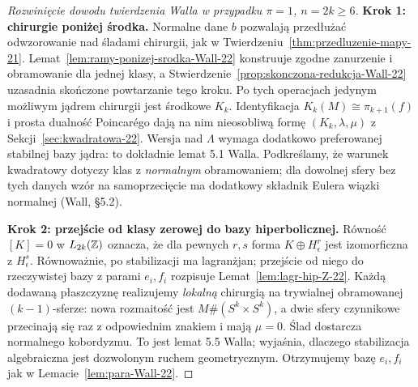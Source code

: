 \begin{proof}[Rozwinięcie dowodu twierdzenia Walla w przypadku
 $\pi=1$, $n=2k\geq6$]
\textbf{Krok 1: chirurgie poniżej środka.}
Normalne dane $b$ pozwalają przedłużać
odwzorowanie nad śladami chirurgii, jak w
Twierdzeniu~\ref{thm:przedluzenie-mapy-21}.
Lemat~\ref{lem:ramy-ponizej-srodka-Wall-22}
konstruuje zgodne zanurzenie i obramowanie
dla jednej klasy, a
Stwierdzenie~\ref{prop:skonczona-redukcja-Wall-22}
uzasadnia skończone powtarzanie tego kroku.
Po tych operacjach jedynym możliwym
jądrem chirurgii jest środkowe $K_k$.
Identyfikacja $K_k(M)\cong\pi_{k+1}(f)$
i prosta dualność Poincarégo dają
na nim nieosobliwą formę
$(K_k,\lambda,\mu)$ z
Sekcji~\ref{sec:kwadratowa-22}.
Wersja nad $\Lambda$ wymaga dodatkowo
preferowanej stabilnej bazy jądra:
to dokładnie lemat 5.1 Walla.
Podkreślamy, że warunek kwadratowy dotyczy
klas z \emph{normalnym} obramowaniem;
dla dowolnej sfery bez tych danych wzór
na samoprzecięcie ma dodatkowy składnik
Eulera wiązki normalnej (Wall, §5.2).

\textbf{Krok 2: przejście od klasy zerowej do
bazy hiperbolicznej.}
Równość $[K]=0$ w $L_{2k}(\mathbb{Z})$
oznacza, że dla pewnych $r,s$
forma $K\oplus H_\epsilon^r$ jest
izomorficzna z $H_\epsilon^s$.
Równoważnie, po stabilizacji ma
lagranżjan; przejście od niego do
rzeczywistej bazy z parami $e_i,f_i$
rozpisuje Lemat~\ref{lem:lagr-hip-Z-22}.
Każdą dodawaną
płaszczyznę realizujemy \emph{lokalną}
chirurgią na trywialnej obramowanej
$(k-1)$-sferze: nowa rozmaitość jest
$M\#(S^k\times S^k)$, a dwie sfery
czynnikowe przecinają się raz z
odpowiednim znakiem i mają $\mu=0$.
Ślad dostarcza normalnego kobordyzmu.
To jest lemat 5.5 Walla; wyjaśnia, dlaczego
stabilizacja algebraiczna jest dozwolonym
ruchem geometrycznym. Otrzymujemy bazę
$e_i,f_i$ jak w Lemacie~\ref{lem:para-Wall-22}.


\end{proof}

